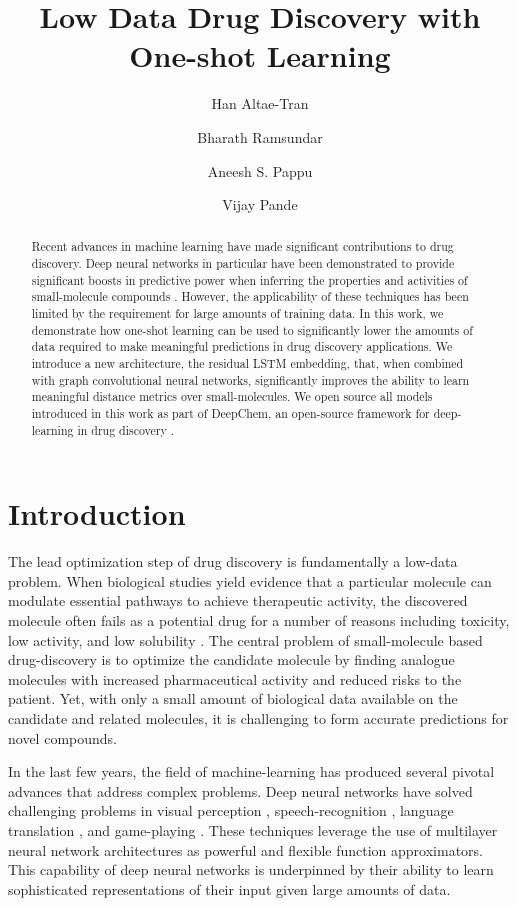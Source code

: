 \documentclass[journal=jacsat,manuscript=article]{achemso}
\author{Han Altae-Tran}
\affiliation{Department of Biological Engineering, Massachusetts Institute of Technology}
\author{Bharath Ramsundar}
\affiliation{Department of Computer Science, Stanford University}
\author{Aneesh S. Pappu}
\affiliation{Department of Computer Science, Stanford University}
\author{Vijay Pande}
\affiliation{Department of Chemistry, Stanford University}
\title{Low Data Drug Discovery with One-shot Learning}
\providecommand{\DIFaddtex}[1]{{\protect\color{blue}\uwave{#1}}} %
\providecommand{\DIFaddbegin}{} %
\providecommand{\DIFaddend}{} %
\providecommand{\DIFadd}[1]{\texorpdfstring{\DIFaddtex{#1}}{#1}} %
\begin{document}
\maketitle

\begin{abstract}
Recent advances in machine learning have made significant contributions to drug discovery. Deep neural networks in particular have been demonstrated to provide significant boosts in predictive power when inferring the properties and activities of small-molecule compounds \cite{ma2015deep}. However, the applicability of these techniques has been limited by the requirement for large amounts of training data. In this work, we demonstrate how one-shot learning can be used to significantly lower the amounts of data required to make meaningful predictions in drug discovery applications. We introduce a new architecture, the residual LSTM embedding, that, when combined with graph convolutional neural networks, significantly improves the ability to learn meaningful distance metrics over small-molecules. We open source all models introduced in this work as part of DeepChem, an open-source framework for deep-learning in drug discovery
\DIFaddbegin \DIFadd{TEST TEST TEST
}\DIFaddend \cite{ram2016}.
\end{abstract}

\section{Introduction}
The lead optimization step of drug discovery is fundamentally a low-data problem. When biological studies yield evidence that a particular molecule can modulate essential pathways to achieve therapeutic activity, the discovered molecule often fails as a potential drug for a number of reasons including toxicity, low activity, and low solubility \cite{waring2015analysis}. The central problem of small-molecule based drug-discovery is to optimize the candidate molecule by finding analogue molecules with increased pharmaceutical activity and reduced risks to the patient. Yet, with only a small amount of biological data available on the candidate and related molecules, it is challenging to form accurate predictions for novel compounds.

In the last few years, the field of machine-learning has produced several pivotal advances that address complex problems. Deep neural networks have solved challenging problems in visual perception \cite{ILSVRC15}, speech-recognition \cite{deng2013new}, language translation \cite{wu2016google}, and game-playing \cite{silver2016mastering}. These techniques leverage the use of multilayer neural network architectures as powerful and flexible function approximators. This capability of deep neural networks is underpinned by their ability to learn sophisticated representations of their input given large amounts of data.
\end{document}
